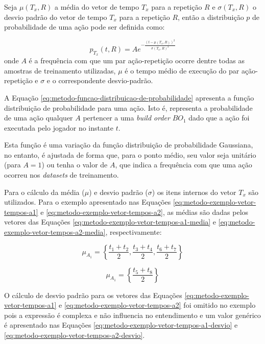 Seja $\mu(T_x, R)$ a média do vetor de tempo $T_x$ para a repetição $R$ e $\sigma(T_x, R)$ o desvio padrão do vetor de tempo $T_x$ para a repetição $R$, então a distribuição $p$ de probabilidade de uma ação pode ser definida como:

\begin{equation}
	p_{T_x}(t, R) = A e^{-\frac{(t-\mu(T_x, R))^2}{{\sigma(T_x, R)}^2}}
	\label{eq:metodo-funcao-distribuicao-de-probabilidade}
\end{equation}
\noindent onde $A$ é a frequência com que um par ação-repetição ocorre dentre todas as amostras de treinamento utilizadas, $\mu$ é o tempo médio de execução do par ação-repetição e $\sigma$ e o correspondente desvio-padrão.

A Equação \ref{eq:metodo-funcao-distribuicao-de-probabilidade} apresenta a função distribuição de probabilidade para uma ação. Isto é, representa a probabilidade de uma ação qualquer $A$ pertencer a uma \textit{build order} $BO_1$ dado que a ação foi executada pelo jogador no instante $t$.

Esta função é uma variação da função distribuição de probabilidade Gaussiana, no entanto, é ajustada de forma que, para o ponto médio, seu valor seja unitário (para $A=1$) ou tenha o valor de $A$, que indica a frequência com que uma ação ocorreu nos \textit{datasets} de treinamento.

Para o cálculo da média ($\mu$) e desvio padrão ($\sigma$) os itens internos do vetor $T_x$ são utilizados. Para o exemplo apresentado nas Equações \ref{eq:metodo-exemplo-vetor-tempos-a1} e \ref{eq:metodo-exemplo-vetor-tempos-a2}, as médias são dadas pelos vetores das Equações \ref{eq:metodo-exemplo-vetor-tempos-a1-media} e \ref{eq:metodo-exemplo-vetor-tempos-a2-media}, respectivamente:

\begin{equation}
    \mu_{A_1} = \left\{
		\frac{t_1 + t_2}{2}, 
		\frac{t_3 + t_4}{2}, 		
		\frac{t_6 + t_7}{2}
	\right\}
	\label{eq:metodo-exemplo-vetor-tempos-a1-media}
\end{equation}

\begin{equation}
    \mu_{A_1} = \left\{
		\frac{t_5 + t_8}{2}
	\right\}
	\label{eq:metodo-exemplo-vetor-tempos-a2-media}
\end{equation}

O cálculo de desvio padrão para os vetores das Equações \ref{eq:metodo-exemplo-vetor-tempos-a1} e \ref{eq:metodo-exemplo-vetor-tempos-a2} foi omitido no exemplo pois a expressão é complexa e não influencia no entendimento e um valor genérico é apresentado nas Equações \ref{eq:metodo-exemplo-vetor-tempos-a1-desvio} e \ref{eq:metodo-exemplo-vetor-tempos-a2-desvio}.


